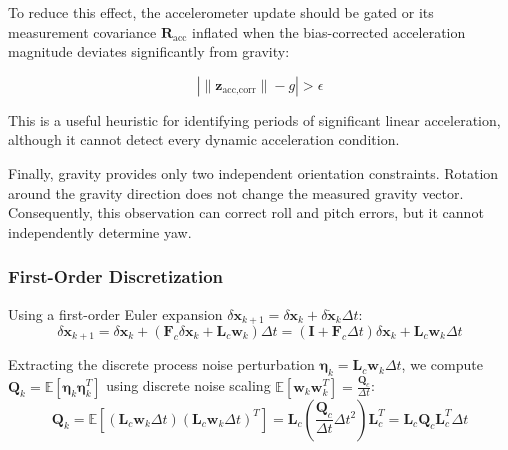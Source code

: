 \documentclass{article}
\begin{document}
	To reduce this effect, the accelerometer update should be gated or its measurement covariance $\mathbf{R}_{\text{acc}}$ inflated when the bias-corrected acceleration magnitude deviates significantly from gravity:
	
	\begin{equation*}
		\left|\|\mathbf{z}_{\text{acc,corr}}\|-g\right| > \epsilon
	\end{equation*}
	
	This is a useful heuristic for identifying periods of significant linear acceleration, although it cannot detect every dynamic acceleration condition.
	
	Finally, gravity provides only two independent orientation constraints. Rotation around the gravity direction does not change the measured gravity vector. Consequently, this observation can correct roll and pitch errors, but it cannot independently determine yaw.





	
	\subsubsection{First-Order Discretization}
	
	Using a first-order Euler expansion $\delta\mathbf{x}_{k+1} = \delta\mathbf{x}_k + \delta\dot{\mathbf{x}}_k \Delta t$:
	\begin{equation}
		\delta\mathbf{x}_{k+1} = \delta\mathbf{x}_k + \left( \mathbf{F}_c \delta\mathbf{x}_k + \mathbf{L}_c \mathbf{w}_k \right) \Delta t = \left( \mathbf{I} + \mathbf{F}_c \Delta t \right) \delta\mathbf{x}_k + \mathbf{L}_c \mathbf{w}_k \Delta t
	\end{equation}
	
	Extracting the discrete process noise perturbation $\boldsymbol{\eta}_k = \mathbf{L}_c \mathbf{w}_k \Delta t$, we compute $\mathbf{Q}_k = \mathbb{E}[\boldsymbol{\eta}_k \boldsymbol{\eta}_k^T]$ using discrete noise scaling $\mathbb{E}[\mathbf{w}_k \mathbf{w}_k^T] = \frac{\mathbf{Q}_c}{\Delta t}$:
	\begin{equation}
		\mathbf{Q}_k = \mathbb{E}\left[ \left(\mathbf{L}_c \mathbf{w}_k \Delta t\right) \left(\mathbf{L}_c \mathbf{w}_k \Delta t\right)^T \right] = \mathbf{L}_c \left( \frac{\mathbf{Q}_c}{\Delta t} \Delta t^2 \right) \mathbf{L}_c^T = \mathbf{L}_c \mathbf{Q}_c \mathbf{L}_c^T \Delta t
	\end{equation}
	
\end{document}
